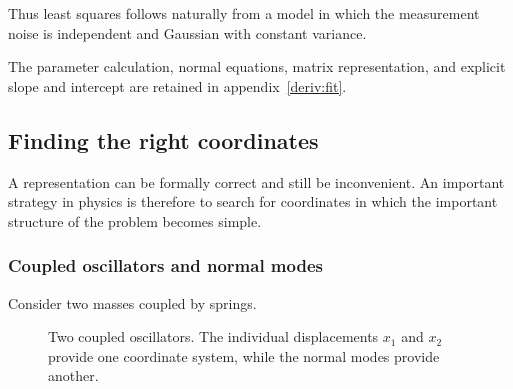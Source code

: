 Thus least squares follows naturally from a model in which the measurement noise is independent and Gaussian with constant variance.



The parameter calculation, normal equations, matrix representation, and explicit slope and intercept are retained in appendix~\ref{deriv:fit}.
\subsection{Finding the right coordinates}
\label{sec:coordinates}



A representation can be formally correct and still be inconvenient.
An important strategy in physics is therefore to search for coordinates in which the important structure of the problem becomes simple.



\subsubsection{Coupled oscillators and normal modes}
\label{sec:normal-modes}


Consider two masses coupled by springs.

\begin{figure}[h!]
\centering
{}
\caption{Two coupled oscillators.
The individual displacements $x_1$ and $x_2$ provide one coordinate system, while the normal modes provide another.}
\end{figure}

